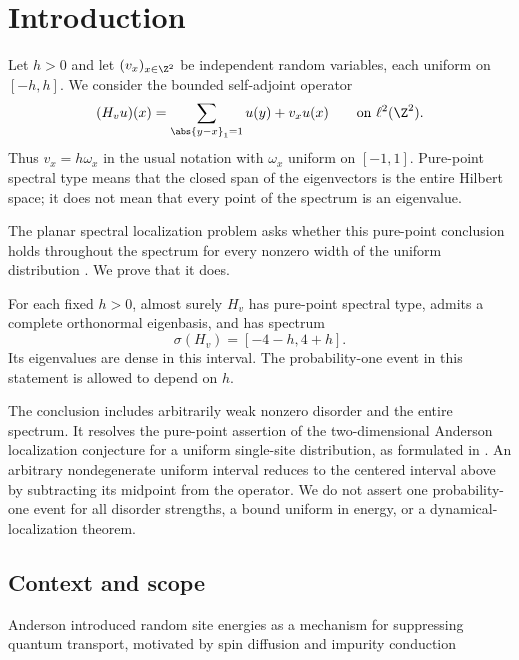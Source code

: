 \section{Introduction}

Let $h>0$ and let $(v_x)_{x\in\Z^2}$ be independent random variables,
each uniform on $[-h,h]$. We consider the bounded self-adjoint operator
\begin{equation}\label{setup:model}
 (H_v u)(x)=\sum_{\abs{y-x}_1=1}u(y)+v_xu(x)
 \qquad\text{on }\ell^2(\Z^2).
\end{equation}
Thus $v_x=h\omega_x$ in the usual notation with $\omega_x$ uniform on
$[-1,1]$. Pure-point spectral type means that the closed span of the
eigenvectors is the entire Hilbert space; it does not mean that every
point of the spectrum is an eigenvalue.

The planar spectral localization problem asks whether this pure-point
conclusion holds throughout the spectrum for every nonzero width of the
uniform distribution \cite[Example~2.1 and Problem~2]{Simon2000}.
We prove that it does.

\begin{theorem}\label{main:theorem}
For each fixed $h>0$, almost surely $H_v$ has pure-point spectral type,
admits a complete orthonormal eigenbasis, and has spectrum
\[
 \sigma(H_v)=[-4-h,4+h].
\]
Its eigenvalues are dense in this interval. The probability-one event
in this statement is allowed to depend on $h$.
\end{theorem}

The conclusion includes arbitrarily weak nonzero disorder and the entire
spectrum. It resolves the pure-point assertion of the two-dimensional
Anderson localization conjecture for a uniform single-site distribution,
as formulated in \cite[Problem~2]{Simon2000}. An arbitrary nondegenerate
uniform interval reduces to the centered interval above by subtracting
its midpoint from the operator. We do not assert one probability-one
event for all disorder strengths, a bound uniform in energy, or a
dynamical-localization theorem.

\subsection*{Context and scope}
Anderson introduced random site energies as a mechanism for suppressing
quantum transport, motivated by spin diffusion and impurity conduction
